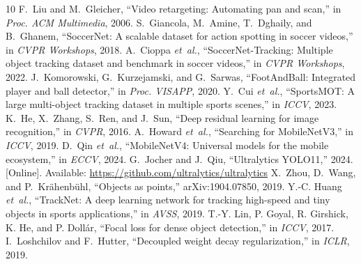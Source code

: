 \documentclass[conference]{IEEEtran}
\begin{document}
\begin{thebibliography}{10}
 F.~Liu and M.~Gleicher, ``Video retargeting: Automating pan and scan,'' in \emph{Proc. ACM Multimedia}, 2006.
 S.~Giancola, M.~Amine, T.~Dghaily, and B.~Ghanem, ``SoccerNet: A scalable dataset for action spotting in soccer videos,'' in \emph{CVPR Workshops}, 2018.
 A.~Cioppa \emph{et~al.}, ``SoccerNet-Tracking: Multiple object tracking dataset and benchmark in soccer videos,'' in \emph{CVPR Workshops}, 2022.
 J.~Komorowski, G.~Kurzejamski, and G.~Sarwas, ``FootAndBall: Integrated player and ball detector,'' in \emph{Proc. VISAPP}, 2020.
 Y.~Cui \emph{et~al.}, ``SportsMOT: A large multi-object tracking dataset in multiple sports scenes,'' in \emph{ICCV}, 2023.
 K.~He, X.~Zhang, S.~Ren, and J.~Sun, ``Deep residual learning for image recognition,'' in \emph{CVPR}, 2016.
 A.~Howard \emph{et~al.}, ``Searching for MobileNetV3,'' in \emph{ICCV}, 2019.
 D.~Qin \emph{et~al.}, ``MobileNetV4: Universal models for the mobile ecosystem,'' in \emph{ECCV}, 2024.
 G.~Jocher and J.~Qiu, ``Ultralytics YOLO11,'' 2024. [Online]. Available: \url{https://github.com/ultralytics/ultralytics}
 X.~Zhou, D.~Wang, and P.~Kr\"ahenb\"uhl, ``Objects as points,'' arXiv:1904.07850, 2019.
 Y.-C. Huang \emph{et~al.}, ``TrackNet: A deep learning network for tracking high-speed and tiny objects in sports applications,'' in \emph{AVSS}, 2019.
 T.-Y. Lin, P. Goyal, R. Girshick, K. He, and P. Doll\'ar, ``Focal loss for dense object detection,'' in \emph{ICCV}, 2017.
 I.~Loshchilov and F.~Hutter, ``Decoupled weight decay regularization,'' in \emph{ICLR}, 2019.
\end{thebibliography}
\end{document}
